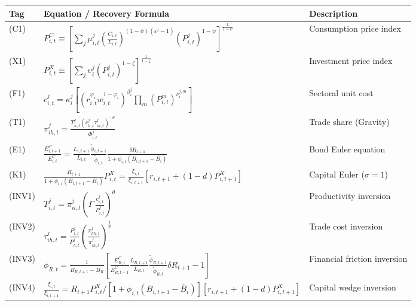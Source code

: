\begin{tabular}{p{0.5cm} p{7.0cm} p{2.0cm}}
\toprule
\textbf{Tag} & \textbf{Equation / Recovery Formula} & \textbf{Description} \\
\midrule
(C1) & $\displaystyle P^C_{i,t} \equiv \left[\sum_j \mu^j_{i,t}\left(\frac{C_{i,t}}{L_{i,t}}\right)^{(1-\psi)(\varepsilon^j-1)}(P^j_{i,t})^{1-\psi}\right]^{\frac{1}{1-\psi}}$ & Consumption price index \\

(X1) & $\displaystyle P^X_{i,t} \equiv \left[\sum_{j} \upsilon^j_{i}(P^j_{i,t})^{1-\zeta}\right]^{\frac{1}{1-\zeta}}$ & Investment price index \\

(F1) & $\displaystyle c^j_{i,t} = \kappa^j_i \left[(r_{i,t}^{\varphi_i} w_{i,t}^{1-\varphi_i})^{\beta^j_i} \prod_m (P^m_{i,t})^{\nu^{j,m}_i}\right]$ & Sectoral unit cost \\

(T1) & $\displaystyle \pi^j_{ih,t} = \frac{T^j_{h,t}(c^j_{h,t}\tau^j_{ih,t})^{-\theta}}{\Phi^j_{i,t}}$ & Trade share (Gravity) \\

(E1) & $\displaystyle \frac{E^C_{i,t+1}}{E^C_{i,t}} = \frac{L_{i,t+1}}{L_{i,t}}\frac{\widetilde{\phi}_{i,t+1}}{\widetilde{\phi}_{i,t}}\frac{\delta R_{t+1}}{1+\phi_{i,t}(B_{i,t+1}-\bar{B}_i)}$ & Bond Euler equation \\

(K1) & $\displaystyle \frac{R_{t+1}}{1+\phi_{i,t}(B_{i,t+1}-\bar{B}_i)} P^X_{i,t} = \frac{\xi_{i,t}}{\xi_{i,t+1}}\left[r_{i,t+1} + (1-d)P^X_{i,t+1}\right]$ & Capital Euler ($\sigma=1$) \\
\midrule
(INV1) & $\displaystyle T^j_{i,t} = \pi^j_{ii,t}\left(\Gamma\,\frac{c^j_{i,t}}{P^j_{i,t}}\right)^{\theta}$ & Productivity inversion \\

(INV2) & $\displaystyle \tau^j_{ih,t} = \frac{P^j_{i,t}}{P^j_{h,t}} \left(\frac{\pi^j_{hh,t}}{\pi^j_{ih,t}}\right)^{\frac{1}{\theta}}$ & Trade cost inversion \\

(INV3) & $\displaystyle \phi_{R,t} = \frac{1}{B_{R,t+1}-\bar{B}_{R}} \left[ \frac{E^C_{R,t}}{E^C_{R,t+1}}\frac{L_{R,t+1}}{L_{R,t}}\frac{\widetilde{\phi}_{R,t+1}}{\widetilde{\phi}_{R,t}}\delta R_{t+1} - 1 \right]$ & Financial friction inversion \\

(INV4) & $\displaystyle \frac{\xi_{i,t}}{\xi_{i,t+1}} = R_{t+1}P^X_{i,t}\Big/\left[1+\phi_{i,t}(B_{i,t+1}-\bar{B}_i)\right]\left[r_{i,t+1}+(1-d)P^X_{i,t+1}\right]$ & Capital wedge inversion \\
\bottomrule
\end{tabular}
